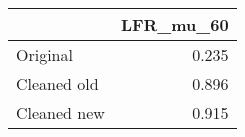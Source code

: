 \begin{tabular}{lr}
\toprule
{} & LFR_mu_60 \\
\midrule
Original    &     0.235 \\
Cleaned old &     0.896 \\
Cleaned new &     0.915 \\
\bottomrule
\end{tabular}
